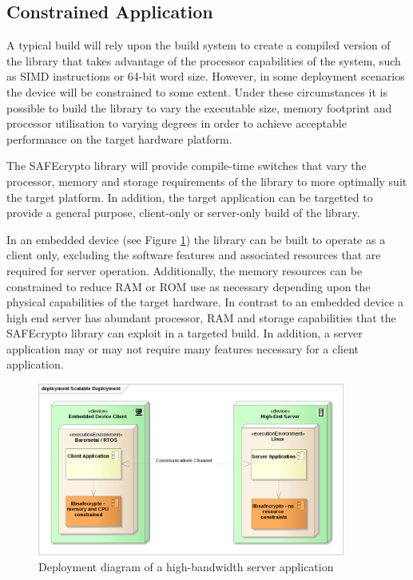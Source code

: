\subsection{Constrained Application}

A typical build will rely upon the build system to create a compiled version of the library that takes advantage of the processor capabilities of the system, such as SIMD instructions or 64-bit word size. However, in some deployment scenarios the device will be constrained to some extent. Under these circumstances it is possible to build the library to vary the executable size, memory footprint and processor utilisation to varying degrees in order to achieve acceptable performance on the target hardware platform.

The SAFEcrypto library will provide compile-time switches that vary the processor, memory and storage requirements of the library to more optimally suit the target platform. In addition, the target application can be targetted to provide a general purpose, client-only or server-only build of the library.

In an embedded device (see Figure \ref{fig:deployment_constrained}) the library can be built to operate as a client only, excluding the software features and associated resources that are required for server operation. Additionally, the memory resources can be constrained to reduce RAM or ROM use as necessary depending upon the physical capabilities of the target hardware. In contrast to an embedded device a high end server has abundant processor, RAM and storage capabilities that the SAFEcrypto library can exploit in a targeted build. In addition, a server application may or may not require many features necessary for a client application.

\begin{figure}[ht]
\centering
\includegraphics[width=0.9\textwidth]{scaled_deployment_client_server.png}
\caption{Deployment diagram of a high-bandwidth server application}
\label{fig:deployment_constrained}
\end{figure}

